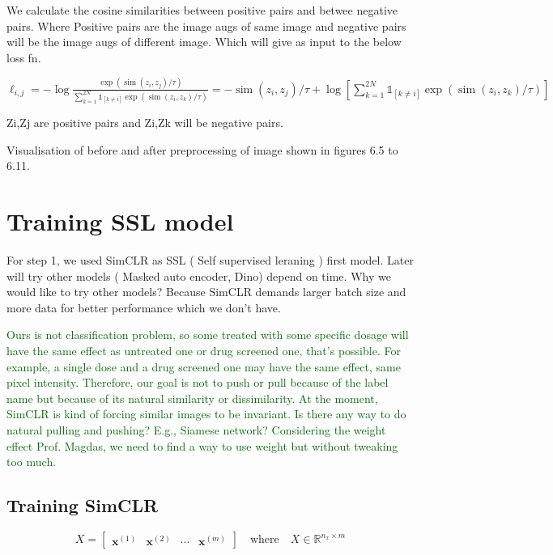 \documentclass[12pt,twoside,a4paper,parskip]{scrbook} %
\begin{document}
  We calculate the cosine similarities between positive pairs and betwee  negative pairs. Where Positive pairs are the image augs of same image and negative pairs will be the image augs of different image. Which will give as input to the below loss fn. 

\( \ell_{i, j}=-\log \frac{\exp \left(\operatorname{sim}\left(z_{i}, z_{j}\right) / \tau\right)}{\sum_{k=1}^{2 N} \mathbb{1}_{[k \neq i]} \exp \left(\operatorname{sim}\left(z_{i}, z_{k}\right) / \tau\right)}=-\operatorname{sim}\left(z_{i}, z_{j}\right) / \tau+\log \left[\sum_{k=1}^{2 N} \mathbb{1}_{[k \neq i]} \exp \left(\operatorname{sim}\left(z_{i}, z_{k}\right) / \tau\right)\right] \)

Zi,Zj are positive pairs and Zi,Zk will be negative pairs.


Visualisation of before and after preprocessing of image shown in figures 6.5 to 6.11.

\section{Training SSL model}

For step 1, we used SimCLR as SSL ( Self supervised leraning ) first model. Later will try other models ( Masked auto encoder, Dino) depend on time. 
Why we would like to try other models? Because SimCLR demands larger batch size and more data for better performance which we don't have.

\textcolor{darkgreen}{Ours is not classification problem, so some treated with some specific dosage will have the same effect as untreated one or drug screened one, that's possible. For example, a single dose and a drug screened one may have the same effect, same pixel intensity. Therefore, our goal is not to push or pull because of the label name but because of its natural similarity or dissimilarity. At the moment, SimCLR is kind of forcing similar images to be invariant. Is there any way to do natural pulling and pushing? E.g., Siamese network? Considering the weight effect Prof. Magdas, we need to find a way to use weight but without tweaking too much.}


\subsection{Training SimCLR}



\[
X = \begin{bmatrix}
  \mathbf{x}^{(1)} & \mathbf{x}^{(2)} & \cdots & \mathbf{x}^{(m)}
\end{bmatrix}
\quad \text{where} \quad X \in \mathbb{R}^{n_x \times m}
\]
\end{document}
